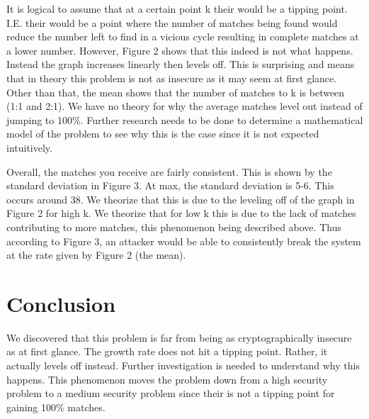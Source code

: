\documentclass{article}
\begin{document}
      It is logical to assume that at a certain point k their would
      be a tipping point. I.E. their would be a point where the number
      of matches being found would reduce the number left to find in a
      vicious cycle resulting in complete matches at a lower number.
      However, Figure 2 shows that this indeed is not
      what happens. Instead the graph increases linearly then levels
      off. This is surprising and means that in theory this problem
      is not as insecure as it may seem at first glance. Other
      than that, the mean shows that the
      number of matches to k is between (1:1 and 2:1). We have no theory
      for why the average matches level out instead of jumping to 100\%.
      Further research needs to be done to determine a mathematical model of the
      problem to see why this is the case since it is not expected intuitively.

      Overall, the matches you receive are fairly consistent. This is
      shown by the standard deviation in Figure 3. At max, the standard
      deviation is 5-6. This occurs around 38. We theorize that this is
      due to the leveling off of the graph in Figure 2 for high k. We theorize
      that for low k this
      is due to the lack of matches contributing to more matches,
      this phenomenon being described above. Thus
      according to Figure 3, an attacker would be
      able to consistently break the system at the rate given by Figure 2 (the mean).
   \section{Conclusion}
      We discovered that this problem is far from being as cryptographically
      insecure as at first glance. The growth rate does not hit a tipping
      point. Rather, it actually levels off instead. Further investigation
      is needed to understand why this happens. This phenomenon
      moves the problem down from a high security problem
      to a medium security problem since their is not a tipping point for
      gaining 100\% matches.
\end{document}
